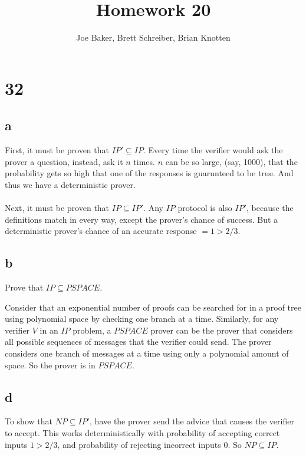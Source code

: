 \documentclass[letterpaper,notitlepage,twoside]{article}
\begin{document}
\title{Homework 20}
\author{Joe Baker, Brett Schreiber, Brian Knotten}
\maketitle

\section*{32}
\subsection*{a}
First, it must be proven that $IP' \subseteq IP$.
Every time the verifier would ask the prover a question, instead, ask it $n$ times. $n$ can be so large, (say, 1000), that the
probability gets so high that one of the responses is guarunteed to be true. And thus we have a deterministic prover. \\\\

Next, it must be proven that $IP \subseteq IP'$.
Any $IP$ protocol is also $IP'$, because the definitions match in every way, except the prover's chance of success.
But a deterministic prover's chance of an accurate response $= 1 > 2/3$.

\subsection*{b}
Prove that $IP \subseteq PSPACE$.

Consider that an exponential number of proofs can be searched for in a proof tree using polynomial space by checking one branch at a time. Similarly, for any verifier $V$ in an $IP$ problem, a $PSPACE$ prover can be the prover that considers all possible sequences of messages that the verifier could send. The prover considers one branch of messages at a time using only a polynomial amount of space. So the prover is in $PSPACE$.

\subsection{d}
To show that $NP \subseteq IP'$, have the prover send the advice that causes the verifier to accept. This works deterministically with probability of accepting correct inputs $1 > 2/3$, and probability of rejecting incorrect inputs $0$. So $NP \subseteq IP$. \\\\
\end{document}
